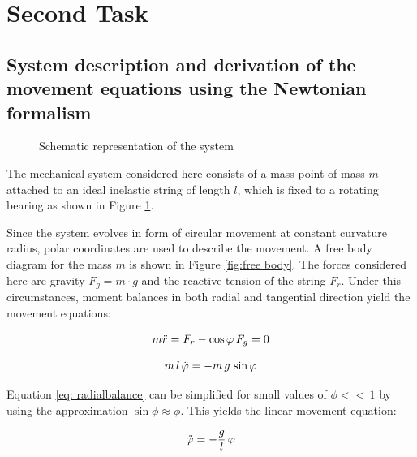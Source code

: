 \documentclass[12pt,bibstyle=none,pagenumberinfooter]{ifmdocument}
\begin{document}
\section{Second Task}

\subsection{System description and derivation of the movement equations using the Newtonian formalism}
\label{sec: NewtonianDerivation}


\begin{figure}[tb]
    \centering
    \def\svgwidth{0.4\textwidth}
    
    \caption{Schematic representation of the system}
    \label{fig:skizze}
\end{figure}



The mechanical system considered here consists of a mass point of mass $m$ attached to an ideal inelastic string of length $l$, which is fixed to a rotating bearing as shown in Figure \ref{fig:skizze}.


Since the system evolves in form of circular movement at constant curvature radius, polar coordinates are used to describe the movement. A free body diagram for the mass $m$ is shown in Figure \ref{fig:free body}. The forces considered here are gravity $F_g = m\cdot g$ and the reactive tension of the string $F_r$. Under this circumstances, moment balances in both radial and tangential direction yield the movement equations:

\begin{equation}
    \label{eq: radialbalance}
    m \Ddot{r} = F_r - \cos{\phi}\,F_g = 0
\end{equation}

\begin{equation}
    \label{eq: tangentialbalance}
    m\, l \, \Ddot{\phi} = -m\, g \,\sin{\phi}
\end{equation}

Equation \ref{eq: radialbalance} can be simplified for small values of $\phi <<\, 1$ by using the approximation $\sin{\phi} \approx \phi $. This yields the linear movement equation:

\begin{equation}
    \Ddot{\phi} = -\frac{g}{l}\,\phi
\end{equation}
\end{document}
